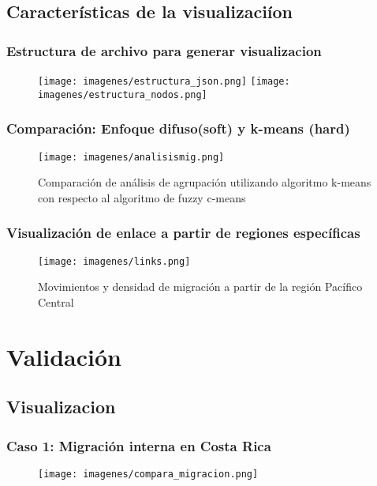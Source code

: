 \documentclass[hyperref={pdfpagelabels=false}]{beamer}
\begin{document}
\subsection{Caracter\'isticas de la visualizaci\'ion}
\begin{frame}
\frametitle{Estructura de archivo para generar visualizacion}
    \begin{figure}
        \begin{center}
            \texttt{[image: imagenes/estructura\_json.png]}
            \texttt{[image: imagenes/estructura\_nodos.png]}
        \end{center}
    \end{figure}
\end{frame}

\begin{frame}
\frametitle{Comparaci\'on: Enfoque difuso(soft) y k-means (hard) }
    \begin{figure}
    \caption{Comparaci\'on de an\'alisis de agrupaci\'on utilizando algoritmo k-means con respecto al algoritmo de fuzzy c-means}
        \begin{center}
            \texttt{[image: imagenes/analisismig.png]}
        \end{center}
    \end{figure}
\end{frame}


\begin{frame}
\frametitle{Visualizaci\'on de enlace a partir de regiones espec\'ificas }
    \begin{figure}
    \caption{Movimientos y densidad de migraci\'on a partir de la regi\'on Pac\'ifico Central}
        \begin{center}
            \texttt{[image: imagenes/links.png]}
        \end{center}
    \end{figure}
\end{frame}
\section{Validaci\'on} 
\subsection{Visualizacion}
\begin{frame}
\frametitle{Caso 1: Migraci\'on interna en Costa Rica}
\begin{figure}
            \texttt{[image: imagenes/compara\_migracion.png]}
    \end{figure}   
\end{frame}
\end{document}
